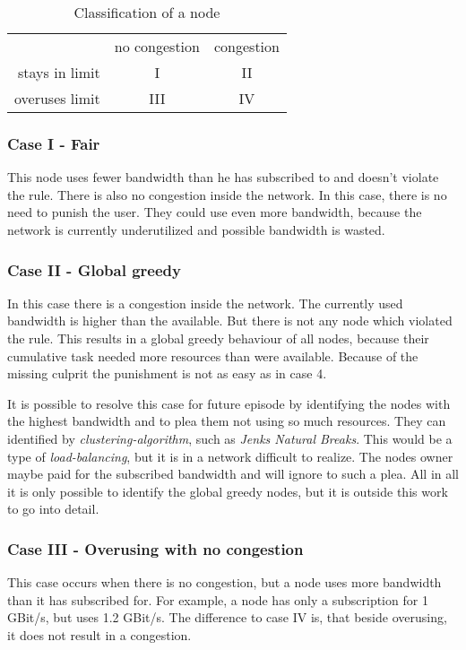 \documentclass[thesis.tex]{subfiles}
\begin{document}
\begin{table}[h]
    \centering
    \begin{tabular}{ r|c|c| }
        \multicolumn{1}{r}{}
        &  \multicolumn{1}{c}{no congestion}
        & \multicolumn{1}{c}{congestion} \\
        \cline{2-3}
        stays in limit & I & II \\
        \cline{2-3}
        overuses limit & III & IV \\
        \cline{2-3}
    \end{tabular}
    \caption{Classification of a node}
    \label{tab:classifyUser}    
\end{table}

\subsubsection{Case I - Fair} \label{sub:main:detection:case1}
This node uses fewer bandwidth than he has subscribed to and doesn't violate the rule. There is also no congestion inside the network. In this case, there is no need to punish the user. They could use even more bandwidth, because the network is currently underutilized and possible bandwidth is wasted.

\subsubsection{Case II - Global greedy}
In this case there is a congestion inside the network. The currently used bandwidth is higher than the available. But there is not any node which violated the rule. This results in a global greedy behaviour of all nodes, because their cumulative task needed more resources than were available.  Because of the missing culprit the punishment is not as easy as in case 4.

It is possible to resolve this case for future episode by identifying the nodes with the highest bandwidth and to plea them not using so much resources. They can identified by \textit{clustering-algorithm}, such as \textit{Jenks Natural Breaks}. This would be a type of \textit{load-balancing}, but it is in a network difficult to realize. The nodes owner maybe paid for the subscribed bandwidth and will ignore to such a plea. All in all it is only possible to identify the global greedy nodes, but it is outside this work to go into detail.


\subsubsection{Case III - Overusing with no congestion}
This case occurs when there is no congestion, but a  node uses more bandwidth than it has subscribed for. For example, a node has only a subscription for 1 GBit/s, but uses 1.2 GBit/s. The difference to case IV is, that beside overusing, it does not result in a congestion.
\end{document}
